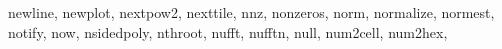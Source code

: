{{%
        newline,%
        newplot,%
        nextpow2,%
        nexttile,%
        nnz,%
        nonzeros,%
        norm,%
        normalize,%
        normest,%
        notify,%
        now,%
        nsidedpoly,%
        nthroot,%
        nufft,%
        nufftn,%
        null,%
        num2cell,%
        num2hex,%
}}
